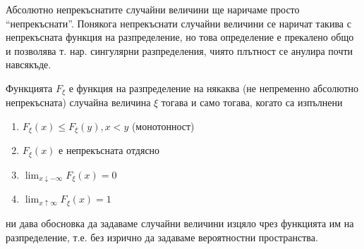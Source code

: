 \documentclass[
  headings=standardclasses,
  bibliography=totocnumbered,
]{scrartcl}
\begin{document}
\begin{remark}
  Абсолютно непрекъснатите случайни величини ще наричаме просто \enquote{непрекъснати}. Понякога непрекъснати случайни величини се наричат такива с непрекъсната функция на разпределение, но това определение е прекалено общо и позволява т. нар. сингулярни разпределения, чиято плътност се анулира почти навсякъде.
\end{remark}

\begin{proposition}\label{thm:cdf_properties}
  Функцията \( F_\xi \) е функция на разпределение на някаква (не непременно абсолютно непрекъсната) случайна величина \( \xi \) тогава и само тогава, когато са изпълнени
  \begin{enumerate}
    \item \( F_\xi(x) \leq F_\xi(y), x < y \) (монотонност)
    \item \( F_\xi(x) \) е непрекъсната отдясно
    \item \( \lim_{x \downarrow -\infty} F_\xi(x) = 0 \)
    \item \( \lim_{x \uparrow \infty} F_\xi(x) = 1 \)
  \end{enumerate}
\end{proposition}

 ни дава обосновка да задаваме случайни величини изцяло чрез функцията им на разпределение, т.е. без изрично да задаваме вероятностни пространства.
\end{document}
